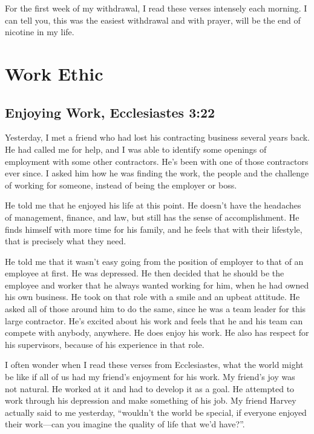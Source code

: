 \documentclass[12pt]{memoir}
\begin{document}
For the first week of my withdrawal, I read these verses intensely
each morning. I can tell you, this was the easiest withdrawal and
with prayer, will be the end of nicotine in my life. 

\section{Work Ethic}

\subsection[Enjoying Work]{Enjoying Work, Ecclesiastes 3:22}

Yesterday, I met a friend who had lost his contracting business several
years back. He had called me for help, and I was able to identify
some openings of employment with some other contractors. He's been
with one of those contractors ever since. I asked him how he was finding
the work, the people and the challenge of working for someone, instead
of being the employer or boss.

He told me that he enjoyed his life at this point. He doesn't have
the headaches of management, finance, and law, but still has the sense
of accomplishment. He finds himself with more time for his family,
and he feels that with their lifestyle, that is precisely what they
need. 

He told me that it wasn't easy going from the position of employer
to that of an employee at first. He was depressed. He then decided
that he should be the employee and worker that he always wanted working
for him, when he had owned his own business. He took on that role
with a smile and an upbeat attitude. He asked all of those around
him to do the same, since he was a team leader for this large contractor.
He's excited about his work and feels that he and his team can compete
with anybody, anywhere. He does enjoy his work. He also has respect
for his supervisors, because of his experience in that role.

I often wonder when I read these verses from Ecclesiastes, what the
world might be like if all of us had my friend's enjoyment for his
work. My friend's joy was not natural. He worked at it and had to
develop it as a goal. He attempted to work through his depression
and make something of his job. My friend Harvey actually said to
me yesterday, ``wouldn't the world be special, if everyone enjoyed
their work---can you imagine the quality of life that we'd have?''.
\end{document}
